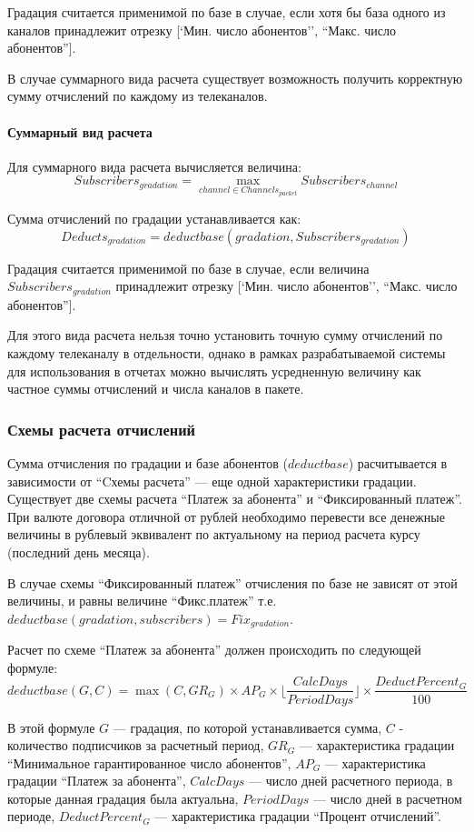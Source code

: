 Градация считается применимой по базе в случае, если хотя бы база одного из каналов принадлежит отрезку 
[`Мин. число абонентов'', ``Макс. число абонентов''].

В случае суммарного вида расчета существует возможность получить корректную сумму отчислений по каждому из 
телеканалов.

\paragraph{Суммарный вид расчета}
Для суммарного вида расчета вычисляется величина:
$$Subscribers_{gradation} = \max\limits_{channel \in Channels_{packet}} Subscribers_{channel}$$

Сумма отчислений по градации устанавливается как:
$$Deducts_{gradation} = deductbase(gradation, Subscribers_{gradation})$$

Градация считается применимой по базе в случае, если величина $Subscribers_{gradation}$ принадлежит отрезку 
[`Мин. число абонентов'', ``Макс. число абонентов''].

Для этого вида расчета нельзя точно установить точную сумму отчислений по каждому телеканалу в отдельности,
однако в рамках разрабатываемой системы для использования в отчетах можно вычислять усредненную величину как частное 
суммы отчислений и числа каналов в пакете.

\subsubsection{Схемы расчета отчислений}
Сумма отчисления по градации и базе абонентов ($deductbase$) расчитывается в зависимости от 
``Cхемы расчета'' --- еще одной характеристики градации. Существует две схемы расчета ``Платеж за абонента''
и ``Фиксированный платеж''. При валюте договора отличной от рублей необходимо перевести все денежные величины
в рублевый эквивалент по актуальному на период расчета курсу (последний день месяца).

В случае схемы ``Фиксированный платеж'' отчисления по базе не зависят от этой величины, и равны величине ``Фикс.платеж'' т.е. 
$ deductbase(gradation, subscribers) = Fix_{gradation} $.

Расчет по схеме ``Платеж за абонента'' должен происходить по следующей формуле:
$$ deductbase(G, C) =  \max(C, GR_{G}) \times AP_{G} \times \lfloor \frac{CalcDays}{PeriodDays} \rfloor \times \frac{DeductPercent_{G}}{100}$$

В этой формуле $G$ --- градация, по которой устанавливается сумма, $C$ - количество подписчиков за расчетный период,
$GR_{G}$ --- характеристика градации ``Минимальное гарантированное число абонентов'',
$AP_{G}$ --- характеристика градации ``Платеж за абонента'',
$CalcDays$ --- число дней расчетного периода, в которые данная градация была актуальна,
$PeriodDays$ --- число дней в расчетном периоде,
$DeductPercent_{G}$ --- характеристика градации ``Процент отчислений''.

